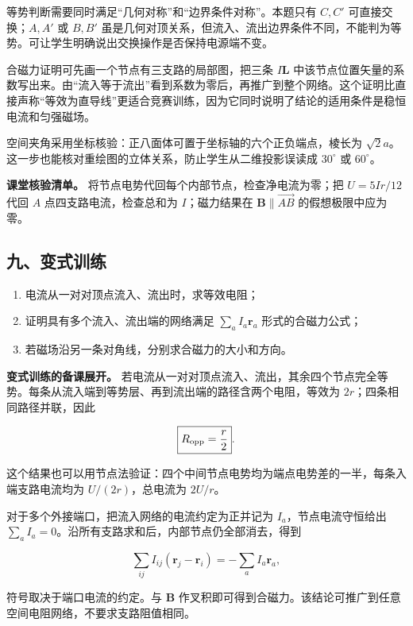 \documentclass[12pt,a4paper,UTF8]{ctexart}
\newcommand{\tightlist}{\setlength{\itemsep}{0pt}\setlength{\parskip}{0pt}}
\begin{document}
等势判断需要同时满足``几何对称''和``边界条件对称''。本题只有 \(C,C'\)
可直接交换；\(A,A'\) 或 \(B,B'\)
虽是几何对顶关系，但流入、流出边界条件不同，不能判为等势。可让学生明确说出交换操作是否保持电源端不变。

合磁力证明可先画一个节点有三支路的局部图，把三条 \(I\bm L\)
中该节点位置矢量的系数写出来。由``流入等于流出''看到系数为零后，再推广到整个网络。这个证明比直接声称``等效为直导线''更适合竞赛训练，因为它同时说明了结论的适用条件是稳恒电流和匀强磁场。

空间夹角采用坐标核验：正八面体可置于坐标轴的六个正负端点，棱长为
\(\sqrt2a\)。这一步也能核对重绘图的立体关系，防止学生从二维投影误读成
\(30^\circ\) 或 \(60^\circ\)。

\textbf{课堂核验清单。} 将节点电势代回每个内部节点，检查净电流为零；把
\(U=5Ir/12\) 代回 \(A\) 点四支路电流，检查总和为 \(I\)；磁力结果在
\(\bm B\parallel\overrightarrow{AB}\) 的假想极限中应为零。

\subsection{九、变式训练}\label{ux4e5dux53d8ux5f0fux8badux7ec3-4}

\begin{enumerate}
\def\labelenumi{\arabic{enumi}.}
\tightlist
\item
  电流从一对对顶点流入、流出时，求等效电阻；
\item
  证明具有多个流入、流出端的网络满足 \(\sum_a I_a\bm r_a\)
  形式的合磁力公式；
\item
  若磁场沿另一条对角线，分别求合磁力的大小和方向。
\end{enumerate}

\textbf{变式训练的备课展开。}
若电流从一对对顶点流入、流出，其余四个节点完全等势。每条从流入端到等势层、再到流出端的路径含两个电阻，等效为
\(2r\)；四条相同路径并联，因此

\[
\boxed{R_{\rm opp}=\frac r2}.
\]

这个结果也可以用节点法验证：四个中间节点电势均为端点电势差的一半，每条入端支路电流均为
\(U/(2r)\)，总电流为 \(2U/r\)。

对于多个外接端口，把流入网络的电流约定为正并记为
\(I_a\)，节点电流守恒给出
\(\sum_a I_a=0\)。沿所有支路求和后，内部节点仍全部消去，得到

\[
\sum_{ij}I_{ij}(\bm r_j-\bm r_i)
=-\sum_a I_a\bm r_a,
\]

符号取决于端口电流的约定。与 \(\bm B\)
作叉积即可得到合磁力。该结论可推广到任意空间电阻网络，不要求支路阻值相同。
\end{document}
